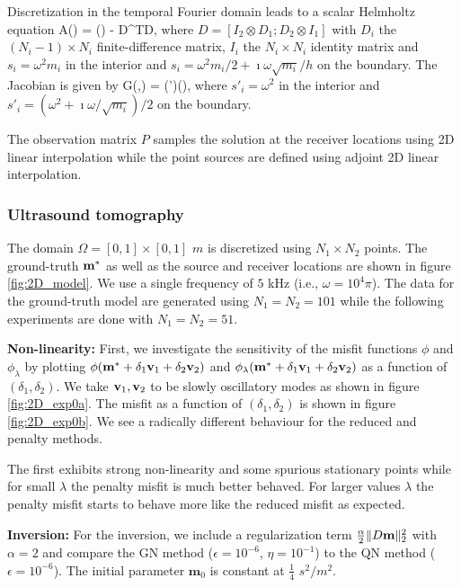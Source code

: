 \documentclass{iopart}
\begin{document}
Discretization in the temporal Fourier domain leads to a scalar Helmholtz equation
\bq
A() = () - D^TD,
\eq
where $D = [I_2\otimes D_1; D_2\otimes I_1]$ with $D_i$ the $(N_i-1)\times N_i$ finite-difference matrix, $I_i$ the $N_i\times N_i$ identity matrix
and $s_i = \omega^2 m_i$ in the interior and $s_i = \omega^2 m_i/2 + \imath\omega\sqrt{m_i}/h$ on the boundary.
The Jacobian is given by
\bq
G(,) = (')(),
\eq
where $s'_i = \omega^2$ in the interior and $s'_i = (\omega^2 + \imath\omega/\sqrt{m_i})/2$ on the boundary.

The observation matrix $P$ samples the solution at the receiver locations using 2D linear interpolation while the point sources are defined using adjoint 2D linear interpolation.

\subsubsection{Ultrasound tomography}

The domain $\Omega = [0,1]\times [0,1]$ $m$  is discretized using $N_1\times N_2$ points. 
The ground-truth $\mathbf{m}^*$ as well as the source and receiver locations are shown in figure  \ref{fig:2D_model}. We use a single frequency of $5$ kHz (i.e., $\omega = 10^4\pi$). The data for the ground-truth model are generated using $N_1=N_2=101$ while the following experiments are done with $N_1=N_2=51$.

\textbf{Non-linearity:}
First, we investigate the sensitivity of the misfit functions $\phi$ and $\phi_{\lambda}$ by plotting $\phi(\mathbf{m}^* + \delta_1 \mathbf{v}_1 + \delta_2\mathbf{v}_2)$ and $\phi_{\lambda}(\mathbf{m}^* + \delta_1 \mathbf{v}_1 + \delta_2\mathbf{v}_2)$ as a function of $(\delta_1,\delta_2)$. 
We take $\mathbf{v}_1, \mathbf{v}_2$ to be slowly oscillatory modes as shown in figure \ref{fig:2D_exp0a}. The misfit as a function of $(\delta_1,\delta_2)$ is shown in figure \ref{fig:2D_exp0b}. We see a radically different behaviour for the reduced and penalty methods.

The first exhibits strong non-linearity and some spurious stationary points while for small $\lambda$ the penalty misfit is much better behaved. For larger values $\lambda$ the penalty misfit starts to behave more like the reduced misfit as expected.

\textbf{Inversion:}
For the inversion, we include a regularization term $\frac{\alpha}{2} \|D\mathbf{m}\|_2^2$ with $\alpha = 2$ and compare  the GN method ($\epsilon=10^{-6}$, $\eta=10^{-1}$) to the QN method ($\epsilon=10^{-6}$). The initial parameter $\mathbf{m}_0$ is constant at $\frac{1}{4}$ $s^2/m^2$.
\end{document}
